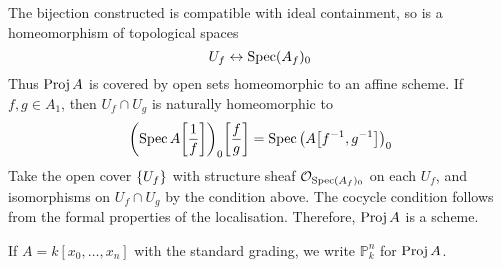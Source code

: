 The bijection constructed is compatible with ideal containment, so is a homeomorphism of topological spaces
\[ U_f \leftrightarrow \operatorname{Spec} (A_f)_0 \]
Thus \( \operatorname{Proj} A \) is covered by open sets homeomorphic to an affine scheme.
If \( f, g \in A_1 \), then \( U_f \cap U_g \) is naturally homeomorphic to
\[ \qty(\operatorname{Spec} A\qty[\frac{1}{f}])_0\qty[\frac{f}{g}] = \operatorname{Spec} \qty(A\qty[f^{-1}, g^{-1}])_0 \]
Take the open cover \( \qty{U_f} \) with structure sheaf \( \mathcal O_{\operatorname{Spec} (A_f)_0} \) on each \( U_f \), and isomorphisms on \( U_f \cap U_g \) by the condition above.
The cocycle condition follows from the formal properties of the localisation.
Therefore, \( \operatorname{Proj} A \) is a scheme.

If \( A = k[x_0, \dots, x_n] \) with the standard grading, we write \( \mathbb P^n_k \) for \( \operatorname{Proj} A \).
